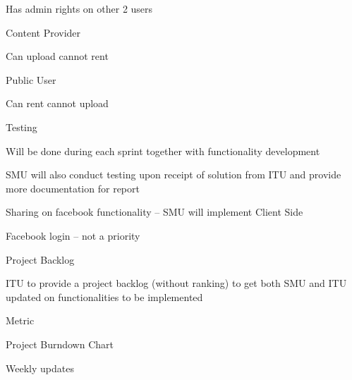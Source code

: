 \begin{my_itemize}
\begin{my_itemize}
\begin{my_itemize}
			\begin{my_itemize}
			\item Has admin rights on other 2 users
			\end{my_itemize}

		\item Content Provider
			
			\begin{my_itemize}
			\item Can upload cannot rent
			\end{my_itemize}

		\item Public User
			
			\begin{my_itemize}
			\item Can rent cannot upload
			\end{my_itemize}

		\end{my_itemize}

	\item Testing

		\begin{my_itemize}
		\item Will be done during each sprint together with functionality development

		\item SMU will also conduct testing upon receipt of solution from ITU and provide more documentation for report
		\end{my_itemize}

	\item Sharing on facebook functionality – SMU will implement Client Side

	\item Facebook login – not a priority
	\end{my_itemize}

\item Project Backlog

	\begin{my_itemize}
	\item ITU to provide a project backlog (without ranking) to get both SMU and ITU updated on functionalities to be implemented
	\end{my_itemize}

\item Metric

	\begin{my_itemize}
	\item Project Burndown Chart

		\begin{my_itemize}
		\item Weekly updates
		\end{my_itemize}

	\end{my_itemize}

\end{my_itemize}

